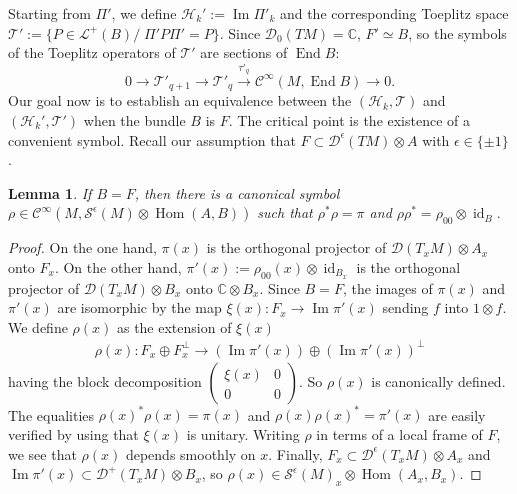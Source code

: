 \documentclass[10pt,a4paper]{article}
\newtheorem{lemm}[theo]{Lemma}
\theoremstyle{definition}
\numberwithin{equation}{section}
\newcommand{\C}{{\mathbb{C}}}
\newcommand{\ep}{\epsilon}
\newcommand{\op}{\operatorname}
\newcommand{\Ci}{{\mathcal{C}}^{\infty}}
\newcommand{\D}{\mathcal{D}}
\newcommand{\symb}{\mathcal{S}}
\newcommand{\lag}{\mathcal{L}}
\newcommand{\Hilb}{\mathcal{H}}
\newcommand{\clT}{\mathcal{T}}
\newcommand{\Uu}{\rho}
\begin{document}
Starting from $\Pi'$, we define $\Hilb_k' := \op{Im} \Pi'_k$ and the corresponding Toeplitz space $\clT' := \{ P
\in \lag^{+} (B)/ \; \Pi' P \Pi' = P \}$. Since $\D_0(TM) = \C$, $F' \simeq B$, so the symbols of the Toeplitz operators of $\clT'$ are sections of $\op{End} B$:
\[
0 \rightarrow \clT'_{q+1} \rightarrow \clT'_q
\xrightarrow{\tau'_q} \Ci (M, \op{End} B) \rightarrow 0.
\]
Our goal now is to establish an equivalence between the $(\Hilb_k, \clT)$ and $(\Hilb_k', \clT')$ when the bundle $B$ is $F$. The critical point is the existence of a convenient symbol. Recall our assumption that $F \subset
\D ^{\ep} (TM) \otimes A$ with $\ep \in \{ \pm 1 \}$.

\begin{lemm}\label{lem:unitary-symbole}
If $B = F$, then there is a canonical symbol $\rho \in \Ci (M, \symb^{\ep} (M) \otimes \op{Hom} (A, B))$ such that $ \rho^* \rho = \pi $ and $\rho \rho ^* = \Uu_{00} \otimes \op{id}_{B}.$
\end{lemm}

\begin{proof}
On the one hand, $\pi (x) $ is the
orthogonal projector of $\D (T_xM) \otimes A_x$ onto $F_x$. On the other hand, $\pi'(x) := \Uu_{00} (x) \otimes \op{id}_{B_x}$ is the orthogonal projector of $\D (T_xM) \otimes B_x$ onto $\C \otimes B_x$. Since $B = F$, the images of $\pi (x)$ and $\pi'(x)$ are isomorphic by the map $ \xi (x) : F_x \rightarrow \op{Im} \pi '(x)$ sending $f$ into $1
\otimes f$. We define $\rho (x)$ as the extension of $\xi(x)$
\begin{gather}\label{eq:def_rho}
\rho (x) : F_x \oplus F_x^{\perp} \rightarrow \left(\op{Im} \pi'(x)\right) \oplus \left(\op{Im} \pi'(x)\right)^{\perp}
\end{gather}
having the block decomposition $
(\begin{smallmatrix} \xi (x) & 0 \\ 0 & 0
\end{smallmatrix})$. So $\rho (x)$ is canonically defined. The equalities $ \rho(x)^* \rho(x) = \pi (x) $ and $\rho(x) \rho(x) ^* = \pi '(x)$ are easily verified by using that $\xi (x)$ is unitary. Writing $\rho $ in terms of a local frame of $F$, we see that $\rho (x)$ depends smoothly on $x$. Finally, $F_x \subset \D^{\ep} (T_xM)\otimes A_x$ and $\op{Im} \pi'(x) \subset \D^{+} (T_x M) \otimes B_x$, so $\rho (x) \in \symb^{\ep} (M)_x \otimes \op{Hom} (A_x, B_x)$.
\end{proof}
\end{document}
